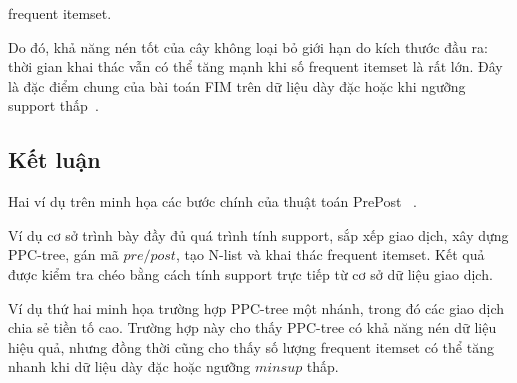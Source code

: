 frequent itemset.

Do đó, khả năng nén tốt của cây không loại bỏ giới hạn do kích thước đầu ra:
thời gian khai thác vẫn có thể tăng mạnh khi số frequent itemset là rất lớn.
Đây là đặc điểm chung của bài toán FIM trên dữ liệu dày đặc hoặc khi ngưỡng
support thấp~\cite{han2011datamining}.

\subsection{Kết luận}

Hai ví dụ trên minh họa các bước chính của thuật toán PrePost
~\cite{deng2012prepost}.

Ví dụ cơ sở trình bày đầy đủ quá trình tính support, sắp xếp giao dịch, xây dựng PPC-tree, gán mã $pre/post$, tạo N-list và khai thác frequent itemset. Kết quả được kiểm tra chéo bằng cách tính support trực tiếp từ cơ sở dữ liệu giao dịch.

Ví dụ thứ hai minh họa trường hợp PPC-tree một nhánh, trong đó các giao dịch chia sẻ tiền tố cao. Trường hợp này cho thấy PPC-tree có khả năng nén dữ liệu hiệu quả, nhưng đồng thời cũng cho thấy số lượng frequent itemset có thể tăng nhanh khi dữ liệu dày đặc hoặc ngưỡng $\mathit{minsup}$ thấp.